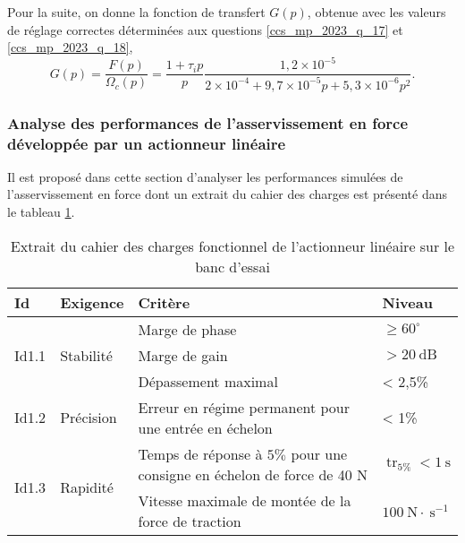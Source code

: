 
\ifprof
\begin{corrige}
\end{corrige}
\else
\fi


Pour la suite, on donne la fonction de transfert $G(p)$, obtenue avec les valeurs de réglage correctes déterminées aux questions \ref{ccs_mp_2023_q_17} et \ref{ccs_mp_2023_q_18},
$$
G(p)=\frac{F(p)}{\Omega_{c}(p)}=\frac{1+\tau_{i} p}{p} \frac{1,2 \times 10^{-5}}{2 \times 10^{-4}+9,7 \times 10^{-5} p+5,3 \times 10^{-6} p^{2}} .
$$

\subsubsection{Analyse des performances de l'asservissement en force développée par un actionneur linéaire}%
Il est proposé dans cette section d'analyser les performances simulées de l'asservissement en force dont un extrait du cahier des charges est présenté dans le tableau \ref{ccs_mp_2023_tab_05}.

\begin{table}[h]
\begin{center}
\begin{tabular}{|l|l|l|l|}
\hline
Id & Exigence & Critère & Niveau \\
\hline
\multirow[t]{3}{*}{Id1.1} & \multirow[t]{3}{*}{Stabilité} & Marge de phase & $\geqslant 60^{\circ}$ \\
\hline
 &  & Marge de gain & $>20 \mathrm{~dB}$ \\
\hline
 &  & Dépassement maximal & < 2,5\% \\
\hline
Id1.2 & Précision & Erreur en régime permanent pour une entrée en échelon & < 1\% \\
\hline
\multirow[t]{2}{*}{Id1.3} & \multirow[t]{2}{*}{Rapidité} & Temps de réponse à $5 \%$ pour une consigne en échelon de force de 40 N & $\operatorname{tr}_{5 \%}<1 \mathrm{~s}$ \\
\hline
 &  & Vitesse maximale de montée de la force de traction & $100 \mathrm{~N} \cdot \mathrm{~s}^{-1}$ \\
\hline
\end{tabular}
\caption{\label{ccs_mp_2023_tab_05}Extrait du cahier des charges fonctionnel de l'actionneur linéaire sur le banc d'essai}
\end{center}
\end{table}

